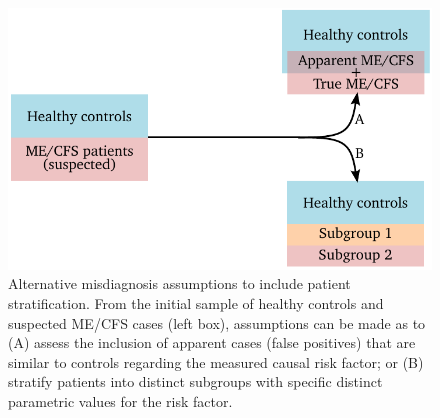 \begin{figure}[h]
    \centering
    \includegraphics{chapter/discussion/figures/stratification-alternatives.pdf}
    \caption[Alternative misdiagnosis assumptions to include patient stratification]{Alternative misdiagnosis assumptions to include patient stratification. From the initial sample of healthy controls and suspected ME/CFS cases (left box), assumptions can be made as to (A) assess the inclusion of apparent cases (false positives) that are similar to controls regarding the measured causal risk factor; or (B) stratify patients into distinct subgroups with specific distinct parametric values for the risk factor.}
    \label{fig:stratification-alternatives}
\end{figure}

